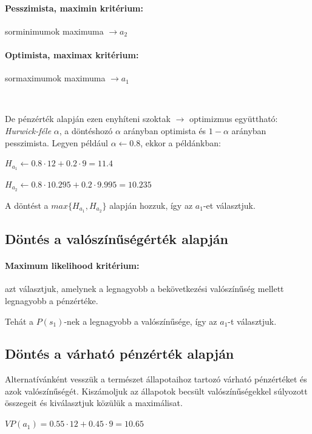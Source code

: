 \documentclass[a4paper,12pt]{article}
\begin{document}
\paragraph{Pesszimista, maximin kritérium:}  sorminimumok maximuma $\rightarrow a_2$
\paragraph{Optimista, maximax kritérium:}  sormaximumok maximuma $\rightarrow a_1$

\

De pénzérték alapján ezen enyhíteni szoktak $\rightarrow$ optimizmus együttható: \emph{Hurwick-féle} $\alpha$, a döntéshozó $\alpha$ arányban optimista és $1-\alpha$ arányban pesszimista. Legyen például $\alpha \gets 0.8$, ekkor a példánkban: 
\begin{center}
$H_{a_1} \gets 0.8\cdot 12 + 0.2\cdot 9 = 11.4$

$H_{a_2} \gets 0.8\cdot 10.295 + 0.2\cdot 9.995 = 10.235$
\end{center}

A döntést a $max\{H_{a_1},H_{a_2}\}$ alapján hozzuk, így az $a_1$-et választjuk.

\subsection{Döntés a valószínűségérték alapján}
\label{susec:vaert}
\paragraph{Maximum likelihood kritérium: } azt választjuk, amelynek a legnagyobb a bekövetkezési valószínűség mellett legnagyobb a pénzértéke. 

Tehát a $P(s_1)$-nek a legnagyobb a valószínűsége, így az $a_1$-t választjuk.

\subsection{Döntés a várható pénzérték alapján}
\label{VP}
Alternatívánként vesszük a természet állapotaihoz tartozó várható pénzértéket és azok valószínűségét. Kiszámoljuk az állapotok becsült valószínűségekkel súlyozott összegeit és kiválasztjuk közülük a maximálisat.

$VP(a_1) = 0.55\cdot 12 + 0.45\cdot 9 = 10.65$
\end{document}
